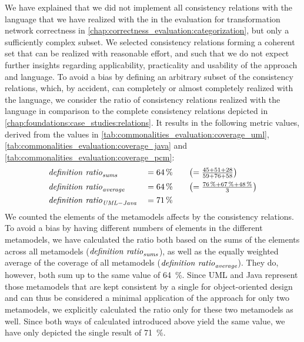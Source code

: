 We have explained that we did not implement all consistency relations with the \commonalities language that we have realized with the \reactionslanguage in the evaluation for transformation network correctness in \autoref{chap:correctness_evaluation:categorization}, but only a sufficiently complex subset.
We selected consistency relations forming a coherent set that can be realized with reasonable effort, and such that we do not expect further insights regarding applicability, practicality and usability of the \commonalities approach and language.
To avoid a bias by defining an arbitrary subset of the consistency relations, which, by accident, can completely or almost completely realized with the \commonalities language, we consider the ratio of consistency relations realized with the \commonalities language in comparison to the complete consistency relations depicted in \autoref{chap:foundations:case_studies:relations}.
It results in the following metric values, derived from the values in \autoref{tab:commonalities_evaluation:coverage_uml}, \autoref{tab:commonalities_evaluation:coverage_java} and \autoref{tab:commonalities_evaluation:coverage_pcm}:
\begin{alignat*}{3}
    &
	\mathit{definition\ ratio}_{\mathit{sums}} &&= \SI{64}{\percent} \quad  &&\bigl(= \tfrac{45 + 51 + 28}{59 + 76 + 58}\bigr)\\
	& 
	\mathit{definition\ ratio}_{\mathit{average}} &&= \SI{64}{\percent} \quad &&\bigl(= \tfrac{\SI{76}{\percent} + \SI{67}{\percent} + \SI{48}{\percent}}{3} \bigr) \\
	&
	\mathit{definition\ ratio}_{\mathit{UML-Java}} &&= \SI{71}{\percent}
\end{alignat*}
We counted the elements of the metamodels affects by the consistency relations.
To avoid a bias by having different numbers of elements in the different metamodels, we have calculated the ratio both based on the sums of the elements across all metamodels ($\mathvariable{definition\ ratio}_{\mathvariable{sums}}$), as well as the equally weighted average of the coverage of all metamodels ($\mathvariable{definition\ ratio}_{\mathvariable{average}}$).
They do, however, both sum up to the same value of \SI{64}{\percent}.
Since \gls{UML} and Java represent those metamodels that are kept consistent by a single \conceptmetamodel for object-oriented design and can thus be considered a minimal application of the \commonalities approach for only two metamodels, we explicitly  calculated the ratio only for these two metamodels as well.
Since both ways of calculated introduced above yield the same value, we have only depicted the single result of \SI{71}{\percent}.


